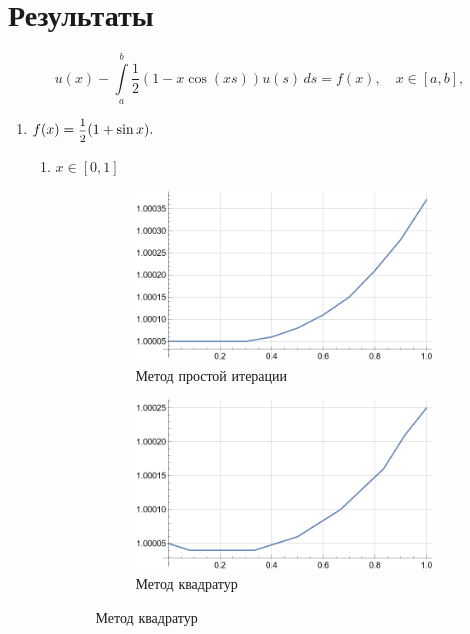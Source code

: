 \documentclass[12pt, a4paper]{article}
\begin{document}
	\section{Результаты}
	\[
	u(x)-\int\limits_a^b\frac12(1-x\cos(xs))u(s)\,ds=f(x),\quad x\in[a,b],
	\]
	\begin{enumerate}
	\item $ f(x)=\hbox{\footnotesize$\displaystyle\frac{1}{2}$}(1+\sin x).$
	\begin{enumerate}
			\centering
		\item $x\in[0,1]$
		\begin{figure}[H]
			\centering
			\begin{subfigure}[b]{0.45\textwidth}
				\centering
				\includegraphics[width=\textwidth]{task1_1_1_simple}
				\caption{Метод простой итерации}
			\end{subfigure}
			\hfill
			\begin{subfigure}[b]{0.45\textwidth}
				\centering
				\includegraphics[width=\textwidth]{task1_1_1_quadro}
				\caption{Метод квадратур}
			\end{subfigure}
		\end{figure}

\end{enumerate}
\end{enumerate}
\end{document}
